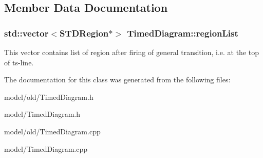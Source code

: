 \subsection{Member Data Documentation}
\hypertarget{classTimedDiagram_a78e0edbe8a03e71f0d229891ef4abe11}{
\subsubsection[{region\-List}]{\setlength{\rightskip}{0pt plus 5cm}std\-::vector$<${\bf S\-T\-D\-Region}$\ast$$>$ Timed\-Diagram\-::region\-List}}\label{classTimedDiagram_a78e0edbe8a03e71f0d229891ef4abe11}
This vector contains list of region after firing of general transition, i.\-e. at the top of ts-\/line. 

The documentation for this class was generated from the following files\-:\begin{DoxyCompactItemize}
\item 
model/old/Timed\-Diagram.\-h\item 
model/Timed\-Diagram.\-h\item 
model/old/Timed\-Diagram.\-cpp\item 
model/Timed\-Diagram.\-cpp\end{DoxyCompactItemize}
